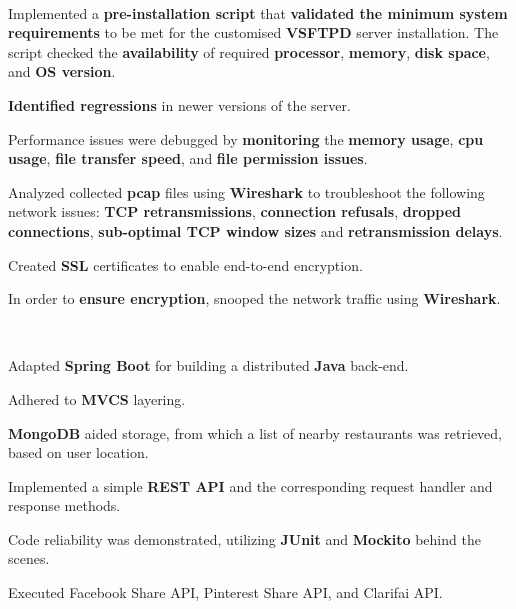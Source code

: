 \documentclass[]{deedy-resume-openfont}
\begin{document}
\begin{minipage}[t]{0.66\textwidth}
\\
\begin{tightemize}
\item Implemented a \textbf{pre-installation script} that \textbf{validated the minimum system requirements} to be met for the customised \textbf{VSFTPD} server installation. The script checked the \textbf{availability} of required \textbf{processor}, \textbf{memory}, \textbf{disk space}, and \textbf{OS version}.
\item \textbf{Identified regressions} in newer versions of the server.
\item Performance issues were debugged by \textbf{monitoring} the \textbf{memory usage}, \textbf{cpu usage}, \textbf{file transfer speed}, and \textbf{file permission issues}.
\item Analyzed collected \textbf{pcap} files using \textbf{Wireshark} to troubleshoot the following network issues: \textbf{TCP retransmissions}, \textbf{connection refusals}, \textbf{dropped connections}, \textbf{sub-optimal TCP window sizes} and \textbf{retransmission delays}.
\item Created \textbf{SSL} certificates to enable end-to-end encryption.
\item In order to \textbf{ensure encryption}, snooped the network traffic using \textbf{Wireshark}.
\end{tightemize}
\sectionsep

\\
\begin{tightemize}
\item Adapted \textbf{Spring Boot} for building a distributed \textbf{Java} back-end.
\item Adhered to \textbf{MVCS} layering. 
\item \textbf{MongoDB} aided storage, from which a list of nearby restaurants was retrieved, based on user location.
\item Implemented a simple \textbf{REST API} and the corresponding request handler and response methods.
\item Code reliability was demonstrated, utilizing \textbf{JUnit} and \textbf{Mockito} behind the scenes.
\item Executed Facebook Share API, Pinterest Share API, and Clarifai API.
\end{tightemize}
\sectionsep


\end{minipage}
\end{document}
